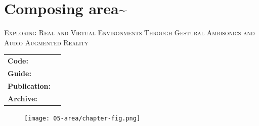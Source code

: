 \chapter{Composing area\textasciitilde{}}\label{sec: area}
\begin{flushright}
    \Large\textsc{Exploring Real and Virtual Environments Through Gestural Ambisonics and Audio Augmented Reality}
\end{flushright}
\begin{SingleSpace}   
    \begin{tabular*}{\textwidth}{@{\extracolsep{\fill}}lr}
     \text{\faGithub}\textbf{Code:}   & \text{\url{https://www.github.com/sambilbow/area}} \\
     \text{\faBook}\textbf{Guide:} & \text{\url{https://www.github.com/sambilbow/area/wiki}} \\
     \text{\faGraduationCap}\textbf{Publication:} &\text{\url{https://dx.doi.org/10.21428/66f840a4.b74711a8}} \\
     \text{\faFileArchiveO}\textbf{Archive:} & \text{\autoref{sec: appendix-a}}
    \end{tabular*}
\end{SingleSpace}%

\begin{figure}
    \centering
    \texttt{[image: 05-area/chapter-fig.png]}
    \captionsetup{labelformat=empty}
    \caption[\autoref*{sec: area}'s page-figure: \textit{area\textasciitilde{}} in use, (from \citeauthor{bilbow2021a}, \citeyear{bilbow2021a})]{}
\end{figure}

